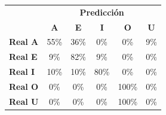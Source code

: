\begin{tabular}{lccccc}
\toprule
 & \multicolumn{5}{c}{\textbf{Predicción}} \\
 & \textbf{A} & \textbf{E} & \textbf{I} & \textbf{O} & \textbf{U} \\
\midrule
\textbf{Real A} & \cellcolor[rgb]{0.62,0.62,1.00} \color{white} 55\% & \cellcolor[rgb]{0.75,0.75,1.00}  36\% & \cellcolor[rgb]{1.00,1.00,1.00}  0\% & \cellcolor[rgb]{1.00,1.00,1.00}  0\% & \cellcolor[rgb]{0.94,0.94,1.00}  9\% \\
\textbf{Real E} & \cellcolor[rgb]{0.94,0.94,1.00}  9\% & \cellcolor[rgb]{0.43,0.43,1.00} \color{white} 82\% & \cellcolor[rgb]{0.94,0.94,1.00}  9\% & \cellcolor[rgb]{1.00,1.00,1.00}  0\% & \cellcolor[rgb]{1.00,1.00,1.00}  0\% \\
\textbf{Real I} & \cellcolor[rgb]{0.93,0.93,1.00}  10\% & \cellcolor[rgb]{0.93,0.93,1.00}  10\% & \cellcolor[rgb]{0.44,0.44,1.00} \color{white} 80\% & \cellcolor[rgb]{1.00,1.00,1.00}  0\% & \cellcolor[rgb]{1.00,1.00,1.00}  0\% \\
\textbf{Real O} & \cellcolor[rgb]{1.00,1.00,1.00}  0\% & \cellcolor[rgb]{1.00,1.00,1.00}  0\% & \cellcolor[rgb]{1.00,1.00,1.00}  0\% & \cellcolor[rgb]{0.30,0.30,1.00} \color{white} 100\% & \cellcolor[rgb]{1.00,1.00,1.00}  0\% \\
\textbf{Real U} & \cellcolor[rgb]{1.00,1.00,1.00}  0\% & \cellcolor[rgb]{1.00,1.00,1.00}  0\% & \cellcolor[rgb]{1.00,1.00,1.00}  0\% & \cellcolor[rgb]{0.30,0.30,1.00} \color{white} 100\% & \cellcolor[rgb]{1.00,1.00,1.00}  0\% \\
\bottomrule
\end{tabular}